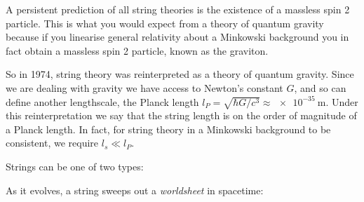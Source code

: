 \documentclass{jknotes}
\begin{document}
A persistent prediction of all string theories is the existence of a massless spin 2 particle. This is what you would expect from a theory of quantum gravity because if you linearise general relativity about a Minkowski background you in fact obtain a massless spin 2 particle, known as the graviton.

So in 1974, string theory was reinterpreted as a theory of quantum gravity. Since we are dealing with gravity we have access to Newton's constant \(G\), and so can define another lengthscale, the Planck length \(l_P = \sqrt{\hbar G/c^3} \approx \SI{e-35}{\meter}\). Under this reinterpretation we say that the string length is on the order of magnitude of a Planck length. In fact, for string theory in a Minkowski background to be consistent, we require \(l_s\ll l_P\).

Strings can be one of two types:
\begin{figure}[H]
    \centering
\end{figure}
As it evolves, a string sweeps out a \emph{worldsheet} in spacetime:
\begin{figure}[H]
    \centering
\end{figure}
\end{document}
